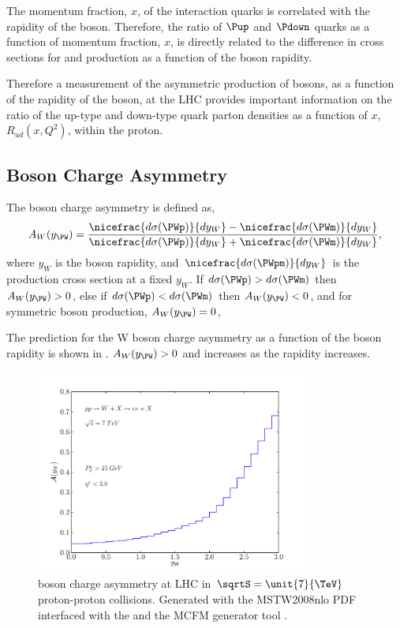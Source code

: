 The momentum fraction, $x$, of the interaction quarks is correlated with the
rapidity of the \PW boson. Therefore, the ratio of $\Pup$ and $\Pdown$ quarks as
a function of momentum fraction, $x$, is directly related to the difference in
cross sections for \PWp and \PWm production as a function of the boson rapidity.

Therefore a measurement of the asymmetric production of \PW bosons, as a
function of the rapidity of the boson, at the {LHC} provides important
information on the ratio of the up-type and down-type quark parton densities as
a function of $x$,
$R_{ud}(x,Q^2)$, within the proton\cite{kom}. 

\subsection{\PW Boson Charge Asymmetry}

The \PWpm boson charge asymmetry is defined as,
\begin{equation}
  A_{W}(y_{\PW})=
    \frac{ 
      \nicefrac{ d\sigma (\PWp) }{ dy_{W} } -
      \nicefrac{ d\sigma (\PWm) }{ dy_{W} }
    }
    {
      \nicefrac{ d\sigma (\PWp) }{ dy_{W} } +
      \nicefrac{ d\sigma (\PWm) }{ dy_{W} }
    }
,
\label{wbos:wasym}
\end{equation} 
where $y_{W}$ is the boson rapidity, and 
$\nicefrac{ d\sigma (\PWpm) }{ dy_{W} }$ is the \PWpm production cross section
at a fixed $y_{W}$.  
If $d\sigma(\PWp) > d\sigma(\PWm) $ then $A_{W}(y_{\PW})> 0$,
else if $d\sigma(\PWp) < d\sigma(\PWm) $ then $A_{W}(y_{\PW})< 0$,
and for symmetric \PWpm boson production, $A_{W}(y_{\PW})= 0$,

The prediction for the W boson charge asymmetry as a function of the boson
rapidity is shown in . $A_{W}(y_{\PW})> 0$ and
increases as the rapidity increases.

\begin{figure}[htbp]
  \centering
  \includegraphics[width=0.8\textwidth]{w-asym}
  \caption[\PW boson charge asymmetry at LHC in $\sqrtS=\unit{7}{\TeV}$
proton-proton collisions.] {\PW boson charge asymmetry at LHC in
$\sqrtS=\unit{7}{\TeV}$ proton-proton collisions.  Generated with the
MSTW2008nlo PDF\cite{martin2009parton} interfaced with the and the MCFM
generator tool \cite{campbellmcfm}.}
  \label{wbos:chargeasym}
\end{figure}

